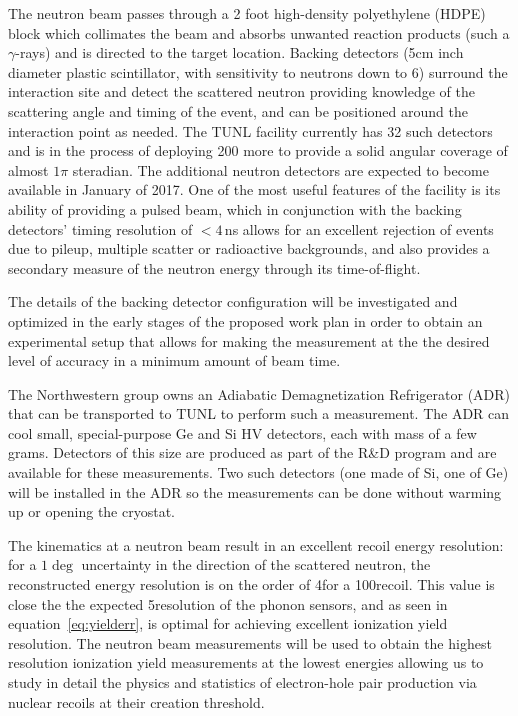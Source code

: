 The neutron beam passes through a 2 foot high-density polyethylene (HDPE) block which collimates the beam and absorbs unwanted reaction products (such a \(\gamma\)-rays) and is directed to the target location. Backing detectors  (5cm inch diameter plastic scintillator, with sensitivity to neutrons down to 6\keV) surround the interaction site and detect the scattered neutron providing knowledge of the scattering angle and timing of the event, and can be positioned around the interaction point as needed. The TUNL facility currently has 32 such detectors and is in the process of deploying 200 more to provide a solid angular coverage of almost \(1\pi\) steradian. The additional neutron detectors are expected to become available in January of 2017. One of the most useful features of the facility is its ability of providing a pulsed beam, which in conjunction with the backing detectors' timing resolution of \(< 4\,\)ns allows for an excellent rejection of events due to pileup, multiple scatter or radioactive backgrounds, and also provides a secondary measure of the neutron energy through its time-of-flight.

The details of the backing detector configuration will be investigated and optimized in the early stages of the proposed work plan in order to obtain an experimental setup that allows for making the measurement at the the desired level of accuracy in a minimum amount of beam time.

The Northwestern \SuperCDMS group owns an Adiabatic Demagnetization Refrigerator (ADR) that can be transported to TUNL to perform such a measurement.  The ADR can cool small, special-purpose Ge and Si HV detectors, each with mass of a few grams. Detectors of this size are produced as part of the \SuperCDMS R\&D program and are available for these measurements. Two such detectors (one made of Si, one of Ge) will be installed in the ADR so the \tunl measurements can be done without warming up or opening the cryostat.

The kinematics at a neutron beam result in an excellent recoil energy resolution: for a \(1\deg\) uncertainty in the direction of the scattered neutron, the reconstructed energy resolution is on the order of 4\eV for a 100\eV recoil. This value is close the the expected 5\eV resolution of the \SuperCDMS phonon sensors, and as seen in equation~\ref{eq:yielderr}, is optimal for achieving excellent ionization yield resolution. The neutron beam measurements will be used to obtain the highest resolution ionization yield measurements at the lowest energies allowing us to study in detail the physics and statistics of electron-hole pair production via nuclear recoils at their creation threshold.


